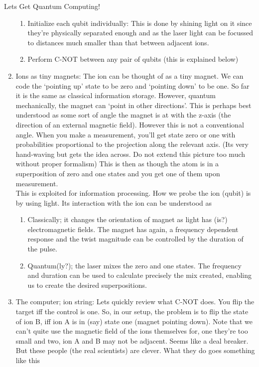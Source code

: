 \documentclass[final,hyperref={pdfpagelabels=false}]{beamer}
\begin{document}
\begin{frame}[t]
\begin{columns}[t]
\begin{column}{.465\textwidth}
\begin{block}{Lets Get Quantum Computing!}
\begin{enumerate}
	\begin{enumerate}
		\item Initialize each qubit individually: This is done by shining light
		on it since they're physically separated enough and as the laser light
		can be focussed to distances much smaller than that between adjacent
		ions.
		\item Perform C-NOT between any pair of qubits (this is explained below)
	\end{enumerate}

	\item Ions as tiny magnets: The ion can be thought of as a tiny magnet.
	We can code the `pointing up' state to be zero and `pointing down' to be one. So far it is the same as classical information storage. However,
	quantum mechanically, the magnet can `point in other directions'.
	This is perhaps best understood as some sort of angle the magnet is
	at with the z-axis (the direction of an external magnetic field).
	However this is not a conventional angle. When you make a measurement,
	you'll get state zero or one with probabilities proportional to the
	projection along the relevant axis. (Its very hand-waving but gets
	the idea across. Do not extend this picture too much without proper
	formalism) This is then as though the atom is in a superposition of
	zero and one states and you get one of them upon measurement.\\
	This is exploited for information processing. How we probe the ion
	(qubit) is by using light. Its interaction with the ion can be understood
	as

	\begin{enumerate}
		\item Classically; it changes the orientation of magnet as light has (is?)
		electromagnetic fields. The magnet has again, a frequency dependent
		response and the twist magnitude can be controlled by the duration
		of the pulse.
		\item Quantum(ly?); the laser mixes the zero and one states. The frequency
		and duration can be used to calculate precisely the mix created,
		enabling us to create the desired superpositions.
	\end{enumerate}

	\item The computer; ion string: Lets quickly review what C-NOT does. You
	flip the target iff the control is one. So, in our setup, the problem
	is to flip the state of ion B, iff ion A is in (say) state one (magnet
	pointing down). Note that we can't quite use the magnetic field of
	the ions themselves for, one they're too small and two, ion A and
	B may not be adjacent. Seems like a deal breaker. But these people
	(the real scientists) are clever. What they do goes something like this


\end{enumerate}
\end{block}
\end{column}
\end{columns}
\end{frame}
\end{document}
